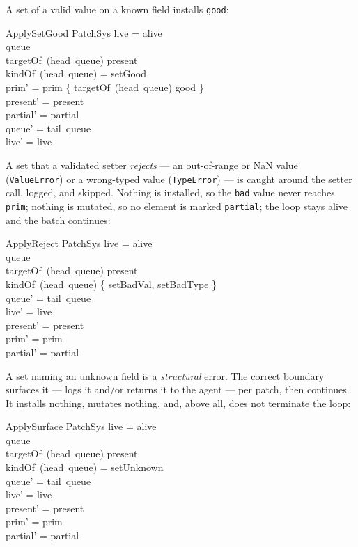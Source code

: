 \documentclass[a4paper,10pt,fleqn]{article}
\begin{document}
A set of a valid value on a known field installs \texttt{good}:

\begin{schema}{ApplySetGood}
  \Delta PatchSys
\where
  live = alive \\
  queue \neq \langle \rangle \\
  targetOf~(head~queue) \in present \\
  kindOf~(head~queue) = setGood \\
  prim' = prim \oplus \{ targetOf~(head~queue) \mapsto good \} \\
  present' = present \\
  partial' = partial \\
  queue' = tail~queue \\
  live' = live
\end{schema}

A set that a validated setter \emph{rejects} --- an out-of-range or NaN
value (\texttt{ValueError}) or a wrong-typed value (\texttt{TypeError}) ---
is caught around the setter call, logged, and skipped.  Nothing is
installed, so the \texttt{bad} value never reaches \texttt{prim}; nothing is
mutated, so no element is marked \texttt{partial}; the loop stays alive and
the batch continues:

\begin{schema}{ApplyReject}
  \Delta PatchSys
\where
  live = alive \\
  queue \neq \langle \rangle \\
  targetOf~(head~queue) \in present \\
  kindOf~(head~queue) \in \{ setBadVal, setBadType \} \\
  queue' = tail~queue \\
  live' = live \\
  present' = present \\
  prim' = prim \\
  partial' = partial
\end{schema}

A set naming an unknown field is a \emph{structural} error.  The correct
boundary surfaces it --- logs it and/or returns it to the agent --- per
patch, then continues.  It installs nothing, mutates nothing, and, above
all, does not terminate the loop:

\begin{schema}{ApplySurface}
  \Delta PatchSys
\where
  live = alive \\
  queue \neq \langle \rangle \\
  targetOf~(head~queue) \in present \\
  kindOf~(head~queue) = setUnknown \\
  queue' = tail~queue \\
  live' = live \\
  present' = present \\
  prim' = prim \\
  partial' = partial
\end{schema}
\end{document}

